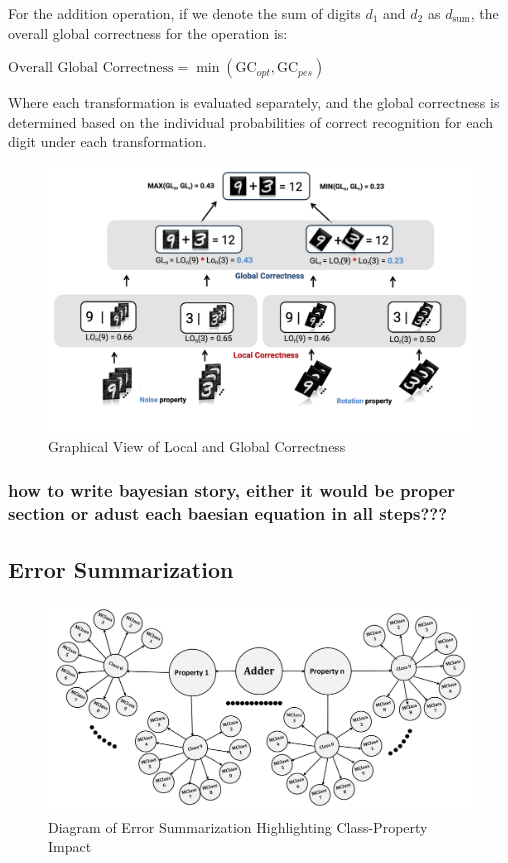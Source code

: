 \documentclass[10pt, conference, a4paper, final]{IEEEtran}
\begin{document}
    For the addition operation, if we denote the sum of digits $d_1$ and $d_2$ as $d_{\text{sum}}$, the overall global correctness for the operation is:
    
        $ \text{Overall Global Correctness} = \min(\text{GC}_{opt}, \text{GC}_{pes})$

    
    Where each transformation is evaluated separately, and the global correctness is determined based on the individual probabilities of correct recognition for each digit under each transformation.
    \begin{figure}{}
        \centering
        \includegraphics[width=\linewidth]{paper_images/noise_rotation_localcal_global.pdf}
        \caption{Graphical View of Local and Global Correctness}
        \label{fig:graph}
    \end{figure}

 
\subsubsection{how to write bayesian story, either it would be proper section or adust each baesian equation in all steps??? }
\subsection{Error Summarization}

\begin{figure}[H]
    \centering
    \includegraphics[width=\linewidth]{paper_images/step5.pdf}
    \caption{Diagram of Error Summarization Highlighting Class-Property Impact}
    \label{fig:error-summarization}
\end{figure}
\end{document}

